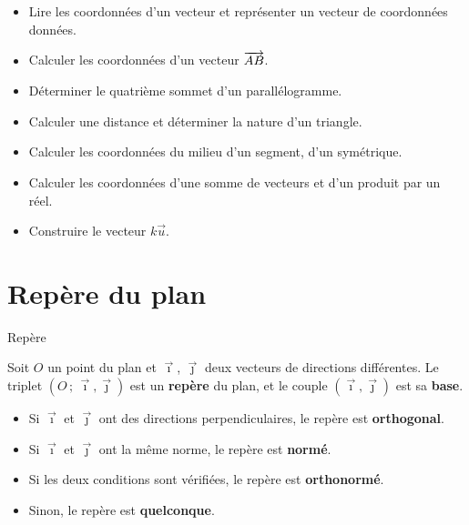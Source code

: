 \documentclass[12pt]{article}
\theoremstyle{break}
\begin{document}
\vspace{1em}
\begin{savoir}{}{}
\begin{itemize}[label=--]
  \item Lire les coordonnées d'un vecteur et représenter un vecteur de coordonnées données.
  \item Calculer les coordonnées d'un vecteur $\overrightarrow{AB}$.
  \item Déterminer le quatrième sommet d'un parallélogramme.
  \item Calculer une distance et déterminer la nature d'un triangle.
  \item Calculer les coordonnées du milieu d'un segment, d'un symétrique.
  \item Calculer les coordonnées d'une somme de vecteurs et d'un produit par un réel.
  \item Construire le vecteur $k\vec u$.
\end{itemize}
\end{savoir}

\newpage

\pagestyle{fancy}

\fancyhf{} %
\fancyhead[R]{ {\Niveau}}
\fancyhead[L]{ {\Chapitre}}
\fancyfoot[R]{{\thepage\  / \pageref{LastPage}}}






\section{Repère du plan}

\begin{definition}{Repère}{}
  \begin{multihide}
  Soit $O$ un point du plan et $\vec\imath$, $\vec\jmath$ deux vecteurs de directions différentes.
  Le triplet $(O\,;\,\vec\imath,\vec\jmath)$ est un \textbf{repère} du plan, et le couple $(\vec\imath,\vec\jmath)$ est sa \textbf{base}.
  \begin{itemize}
    \item Si $\vec\imath$ et $\vec\jmath$ ont des directions perpendiculaires, le repère est \textbf{orthogonal}.
    \item Si $\vec\imath$ et $\vec\jmath$ ont la même norme, le repère est \textbf{normé}.
    \item Si les deux conditions sont vérifiées, le repère est \textbf{orthonormé}.
    \item Sinon, le repère est \textbf{quelconque}.
  \end{itemize}
  \end{multihide}
\end{definition}
\end{document}
